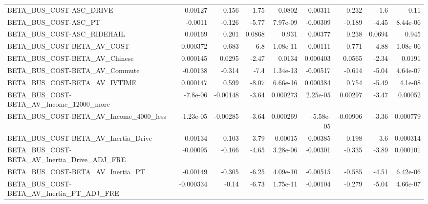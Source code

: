 \begin{tabular}{lrrrrrrrr}
BETA\_BUS\_COST-ASC\_DRIVE                            &     0.00127 &        0.156 &    -1.75 &   0.0802 &    0.00311 &       0.232 &         -1.6 &          0.11 \\
BETA\_BUS\_COST-ASC\_PT                               &     -0.0011 &       -0.126 &    -5.77 & 7.97e-09 &   -0.00309 &      -0.189 &        -4.45 &      8.44e-06 \\
BETA\_BUS\_COST-ASC\_RIDEHAIL                         &     0.00169 &        0.201 &   0.0868 &    0.931 &    0.00377 &       0.238 &       0.0694 &         0.945 \\
BETA\_BUS\_COST-BETA\_AV\_COST                         &    0.000372 &        0.683 &     -6.8 & 1.08e-11 &    0.00111 &       0.771 &        -4.88 &      1.08e-06 \\
BETA\_BUS\_COST-BETA\_AV\_Chinese                      &    0.000145 &       0.0295 &    -2.47 &   0.0134 &   0.000403 &      0.0565 &        -2.34 &        0.0191 \\
BETA\_BUS\_COST-BETA\_AV\_Commute                      &    -0.00138 &       -0.314 &     -7.4 & 1.34e-13 &   -0.00517 &      -0.614 &        -5.04 &      4.64e-07 \\
BETA\_BUS\_COST-BETA\_AV\_IVTIME                       &    0.000147 &        0.599 &    -8.07 & 6.66e-16 &   0.000384 &       0.754 &        -5.49 &       4.1e-08 \\
BETA\_BUS\_COST-BETA\_AV\_Income\_12000\_more            &    -7.8e-06 &     -0.00148 &    -3.64 & 0.000273 &   2.25e-05 &     0.00297 &        -3.47 &       0.00052 \\
BETA\_BUS\_COST-BETA\_AV\_Income\_4000\_less             &   -1.23e-05 &     -0.00285 &    -3.64 & 0.000269 &  -5.58e-05 &    -0.00906 &        -3.36 &      0.000779 \\
BETA\_BUS\_COST-BETA\_AV\_Inertia\_Drive                &    -0.00134 &       -0.103 &    -3.79 &  0.00015 &   -0.00385 &      -0.198 &         -3.6 &      0.000314 \\
BETA\_BUS\_COST-BETA\_AV\_Inertia\_Drive\_ADJ\_FRE        &    -0.00095 &       -0.166 &    -4.65 & 3.28e-06 &   -0.00301 &      -0.335 &        -3.89 &      0.000101 \\
BETA\_BUS\_COST-BETA\_AV\_Inertia\_PT                   &    -0.00149 &       -0.305 &    -6.25 & 4.09e-10 &   -0.00515 &      -0.585 &        -4.51 &      6.42e-06 \\
BETA\_BUS\_COST-BETA\_AV\_Inertia\_PT\_ADJ\_FRE           &   -0.000334 &        -0.14 &    -6.73 & 1.75e-11 &   -0.00104 &      -0.279 &        -5.04 &      4.66e-07 \\

\end{tabular}
